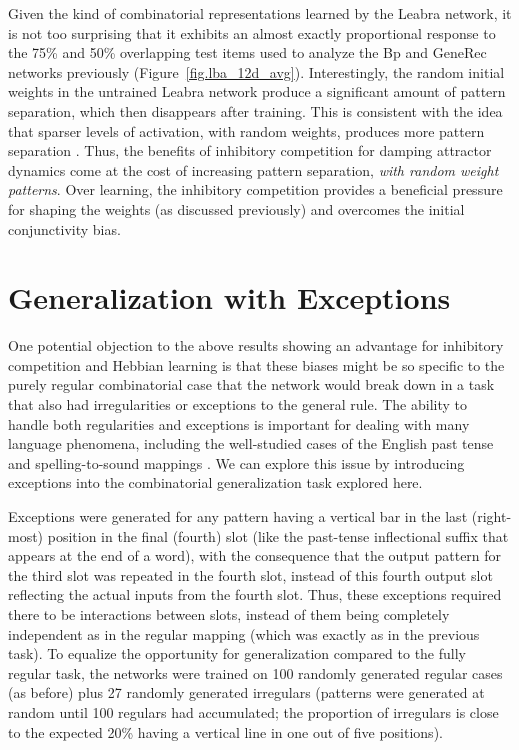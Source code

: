 \documentclass[12pt,twoside]{article}
\begin{document}
Given the kind of combinatorial representations learned by the Leabra
network, it is not too surprising that it exhibits an almost exactly
proportional response to the 75\% and 50\% overlapping test items used
to analyze the Bp and GeneRec networks previously
(Figure~\ref{fig.lba_12d_avg}).  Interestingly, the random initial
weights in the untrained Leabra network produce a significant amount
of pattern separation, which then disappears after training.  This is
consistent with the idea that sparser levels of activation, with
random weights, produces more pattern separation
\cite{OReillyMcClelland94}.  Thus, the benefits of inhibitory
competition for damping attractor dynamics come at the cost of
increasing pattern separation, {\em with random weight patterns}.
Over learning, the inhibitory competition provides a beneficial
pressure for shaping the weights (as discussed previously) and
overcomes the initial conjunctivity bias.

\section{Generalization with Exceptions}

One potential objection to the above results showing an advantage for
inhibitory competition and Hebbian learning is that these biases might
be so specific to the purely regular combinatorial case that the
network would break down in a task that also had irregularities or
exceptions to the general rule.  The ability to handle both
regularities and exceptions is important for dealing with many
language phenomena, including the well-studied cases of the English
past tense and spelling-to-sound mappings
\cite[e.g.,]{RumelhartMcClelland86pt,SeidenbergMcClelland89,PlautMcClellandSeidenbergPatterson96,PlunkettMarchman96}.
We can explore this issue by introducing exceptions into the
combinatorial generalization task explored here.

Exceptions were generated for any pattern having a vertical bar in the
last (right-most) position in the final (fourth) slot (like the
past-tense inflectional suffix that appears at the end of a word),
with the consequence that the output pattern for the third slot was
repeated in the fourth slot, instead of this fourth output slot
reflecting the actual inputs from the fourth slot.  Thus, these
exceptions required there to be interactions between slots, instead of
them being completely independent as in the regular mapping (which was
exactly as in the previous task).  To equalize the opportunity for
generalization compared to the fully regular task, the networks were
trained on 100 randomly generated regular cases (as before) plus 27
randomly generated irregulars (patterns were generated at random until
100 regulars had accumulated; the proportion of irregulars is close to
the expected 20\% having a vertical line in one out of five
positions).
\end{document}
